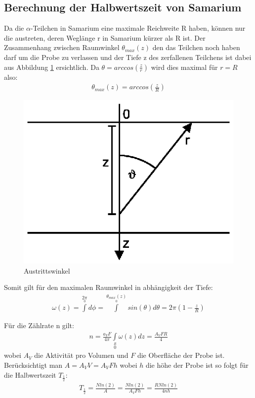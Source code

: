 \documentclass[12pt]{article}
\begin{document}
\subsection{Berechnung der Halbwertszeit von Samarium}
\label{samarium}
Da die $\alpha$-Teilchen in Samarium eine maximale Reichweite R haben, können nur die austreten, deren Weglänge r in Samarium kürzer als R ist. Der Zusammenhang zwischen Raumwinkel $\theta_{max}(z)$ den das Teilchen noch haben darf um die Probe zu verlassen und der Tiefe z des zerfallenen Teilchens ist dabei aus Abbildung \ref{winkel} ersichtlich.
Da $\theta = arccos(\frac{z}{r})$ wird dies maximal für $r=R$ also:
\begin{align}
 \theta_{max}(z) = arccos\left( \frac{z}{R} \right)
\end{align}

\begin{figure}[H]  
\centering
\label{winkel} \includegraphics[width=0.5\linewidth]{pictures/winkel.ps}
\caption{Austrittswinkel}
\end{figure}

Somit gilt für den maximalen Raumwinkel in abhängigkeit der Tiefe:
\begin{align}
 \omega(z)= \int \limits^{2\pi} \limits_{0} d\phi = \int \limits^{\theta_{max}(z)} \limits_{0} sin(\theta)d\theta = 2\pi \left( 1 - \frac{z}{R} \right) 
\end{align}

Für die Zählrate n gilt:
\begin{align}
 n = \frac{a_V F}{4 \pi} \int \limits_0 \limits^R \omega (z) dz = \frac{A_V F R }{4}
\end{align}
wobei $A_V$ die Aktivität pro Volumen und $F$ die Oberfläche der Probe ist. Berücksichtigt man $A=A_V V = A_V F h$ wobei $h$ die höhe der Probe ist so folgt für die Halbwertszeit $T_{\frac{1}{2}}$:
\begin{align}
 T_{\frac{1}{2}} = \frac{N ln(2)}{A} = \frac{N ln(2)}{A_V F h} = \frac{R N ln(2)}{4 n h}
\end{align}
\end{document}
